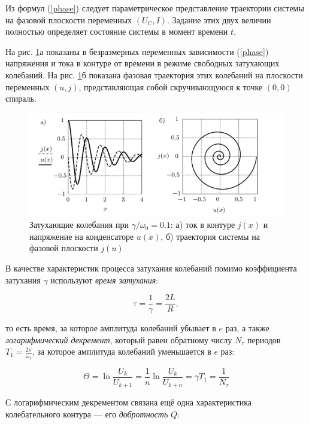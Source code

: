 \documentclass[a4paper, 12pt]{article}
\begin{document}
    Из формул (\ref{phase}) следует параметрическое представление траектории системы на фазовой плоскости переменных $(U_C, I)$. Задание этих двух величин полностью определяет состояние системы в момент времени $t$. 
    
    На рис. \ref{fig:phase}а показаны в безразмерных переменных зависимости (\ref{phase}) напряжения и тока в контуре от времени в режиме свободных затухающих колебаний. На рис. \ref{fig:phase}б показана фазовая траектория этих колебаний на плоскости переменных $(u, j)$, представляющая собой скручивающуюся к точке $(0, 0)$ спираль.

    \begin{figure}[H]
        \centering
        \includegraphics{images/phase.png}
        \caption{Затухающие колебания при $\gamma/\omega_0 =0.1 $: а) ток в контуре $j(x)$ и напряжение на конденсаторе $u(x)$, б) траектория системы на фазовой плоскости $j(u)$}
        \label{fig:phase}
    \end{figure}

    В качестве характеристик процесса затухания колебаний помимо коэффициента затухания $\gamma$ используют \textit{время затухания}:

    \begin{equation}
        \tau = \frac{1}{\gamma} = \frac{2L}{R},
        \label{tau}
    \end{equation}

    то есть время, за которое амплитуда колебаний убывает в $e$ раз, а также \textit{логарифмический декремент}, который равен обратному числу $N_\tau$ периодов $T_1 = \frac{2 \pi}{\omega_1}$, за которое амплитуда колебаний уменьшается в $e$ раз:

    \begin{equation}
        \Theta = \ln{\frac{U_k}{U_{k+1}}} = \frac{1}{n}  \ln{\frac{U_k}{U_{k+n}}} = \gamma T_1 = \frac{1}{N_\tau}
    \end{equation}

    С логарифмическим декрементом связана ещё одна характеристика колебательного контура — его \textit{добротность} $Q$:
\end{document}
